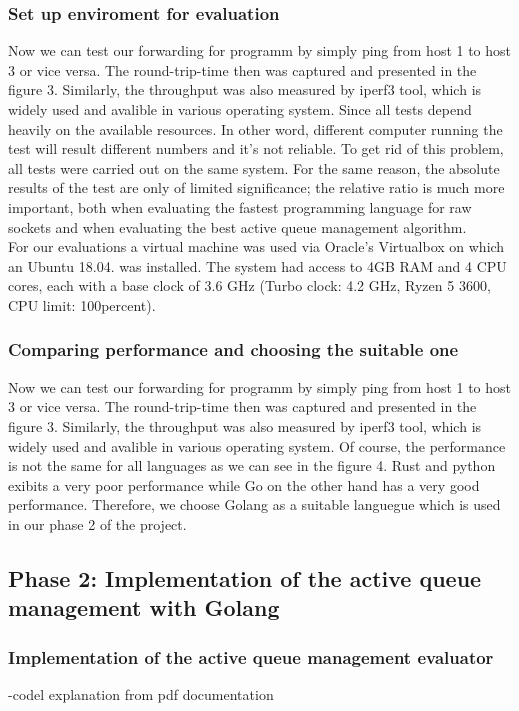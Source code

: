 \subsubsection{Set up enviroment for evaluation}
Now we can test our forwarding for programm by simply ping from host 1 to host 3 or vice versa. The round-trip-time then was captured and presented in the figure 3. Similarly, the throughput was also measured by iperf3 tool, which is widely used and avalible in various operating system. Since all tests depend heavily on the available resources. In other word, different computer running the test will result different numbers and it's not reliable. To get rid of this problem, all tests were carried out on the same system. For the same reason, the absolute results of the test are only of limited significance; the relative ratio is much more important, both when evaluating the fastest programming language for raw sockets and when evaluating the best active queue management algorithm.\\
For our evaluations a virtual machine was used via Oracle's Virtualbox on which an Ubuntu 18.04. was installed. The system had access to 4GB RAM and 4 CPU cores, each with a base clock of 3.6 GHz (Turbo clock: 4.2 GHz, Ryzen 5 3600, CPU limit: 100percent).\\


\subsubsection{Comparing performance and choosing the suitable one}
Now we can test our forwarding for programm by simply ping from host 1 to host 3 or vice versa. The round-trip-time then was captured and presented in the figure 3. Similarly, the throughput was also measured by iperf3 tool, which is widely used and avalible in various operating system. Of course, the performance is not the same for all languages as we can see in the figure 4. Rust and python exibits a very poor performance while Go on the other hand has a very good performance. Therefore, we choose Golang as a suitable languegue which is used in our phase 2 of the project.


\subsection{Phase 2: Implementation of the active queue management with Golang}
\subsubsection{Implementation of the active queue management evaluator}
-codel explanation from pdf documentation



